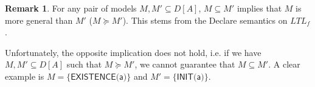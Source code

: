 \documentclass[a4wide,11pt]{article}
\theoremstyle{definition}
\newtheorem{definition}{Definition}[section]
\newtheorem{remark}{Remark}[section]
\theoremstyle{plain}
\begin{document}
\begin{remark}{}\label{re:subset-generality}
For any pair of models $M, M'\subseteq D[A]$, $M\subseteq M'$ implies that $M$ is more general than $M'$ ($M\succeq M'$). This stems from the Declare semantics \cite{2008-Pesic} on $LTL_f$ \cite{DBLP:conf/ijcai/GiacomoV13}.
\end{remark} 

Unfortunately, the opposite implication does not hold, i.e. if we have $M, M'\subseteq D[A]$ such that $M\succeq M'$, we cannot guarantee that $M\subseteq M'$. A clear example is $M=\{\textsf{EXISTENCE(a)}\}$ and $M'=\{\textsf{INIT(a)}\}$.


\end{document}
